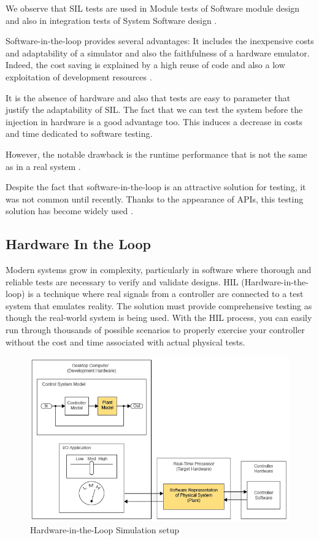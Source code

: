 We observe that SIL tests are used in Module tests of Software module design and also in integration tests of System Software design \cite{06384402}.

Software-in-the-loop provides several advantages:  It includes the inexpensive costs and adaptability of a simulator and also the faithfulness of a hardware emulator. Indeed, the cost saving is explained by a high reuse of code and also a low exploitation of development resources \cite{04455268}.

It is the absence of hardware and also that tests are easy to parameter that justify the adaptability of SIL. The fact that we can test the system before the injection in hardware is a good advantage too. This induces a decrease in costs and time dedicated to software testing.

However, the notable drawback is the runtime performance that is not the same as in a real system \cite{beyer_software_2017}.

Despite the fact that software-in-the-loop is an attractive solution for testing, it was not common until recently. Thanks to the appearance of APIs, this testing solution has become widely used \cite{04455268}.






\newpage


\subsection{Hardware In the Loop}


Modern systems grow in complexity, particularly in software where thorough and reliable tests are necessary to verify and validate designs. HIL (Hardware-in-the-loop) is a technique where real signals from a controller are connected to a test system that emulates reality. The solution must provide comprehensive testing as though the real-world system is being used. With the HIL process, you can easily run through thousands of possible scenarios to properly exercise your controller without the cost and time associated with actual physical tests.\cite{065894}

\begin{figure}[h!]
\centering
\includegraphics[scale=0.55]{images/HIL.png}
\caption{Hardware-in-the-Loop Simulation setup}
\label{fig:hil}
\end{figure}


